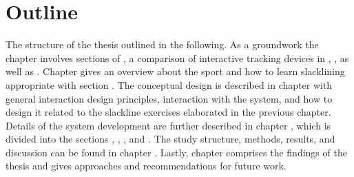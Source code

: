 \section{Outline}
The structure of the thesis outlined in the following.
As a groundwork the \textit{} chapter involves sections of \textit{}, a comparison of interactive tracking devices in \textit{}, \textit{}, as well as \textit{}. Chapter \textit{} gives an overview about the sport and how to learn slacklining appropriate with section \textit{}. The conceptual design is described in chapter \textit{} with general interaction design principles, interaction with the system, and how to design it related to the slackline exercises elaborated in the previous chapter. Details of the system development are further described in chapter \textit{}, which is divided into the sections \textit{}, \textit{}, \textit{}, and \textit{}.
The study structure, methods, results, and discussion can be found in chapter \textit{}. Lastly, chapter \textit{} comprises the findings of the thesis and gives approaches and recommendations for future work.

\begin{comment}
The thesis is structured as follows:
As a groundwork the \textbf{\nameref{2_relatedWork}} chapter involves basics of \textbf{\nameref{2_2_slacklineTraining}}, a number of possible interactive tracking devices that will be compared in the section \textbf{\nameref{2_3_interactiveTechnology}}, and \textbf{\nameref{2_4_methods}}.

- \todo{Further chapters}

A List of \textbf{\nameref{tablesRef}}, \textbf{\nameref{listFiguresRef}}, \textbf{\nameref{listAbbreviationsRef}} and the \textbf{\nameref{bibliographyRef}}  can be found at the end of the thesis.

\end{comment}